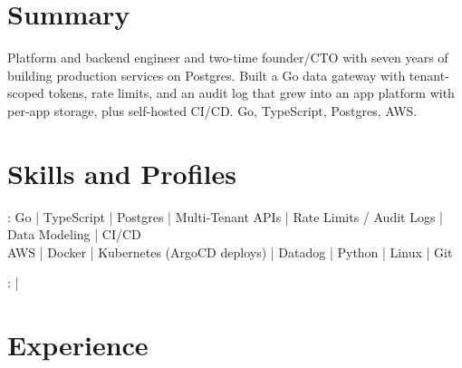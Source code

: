 \documentclass[print]{jack-resume}
\begin{document}
\pagecolor{darkmodeBackground}


\begin{minipage}[t][1cm][t]{.03\textwidth}
    \hfill
\end{minipage}

\section{Summary}
Platform and backend engineer and two-time founder/CTO with seven years of building production services on Postgres. Built a Go data gateway with tenant-scoped tokens, rate limits, and an audit log that grew into an app platform with per-app storage, plus self-hosted CI/CD. Go, TypeScript, Postgres, AWS.
\sectionsep

\section{Skills and Profiles}
:
Go \hfill | \hfill
TypeScript \hfill | \hfill
Postgres \hfill | \hfill
Multi-Tenant APIs \hfill | \hfill
Rate Limits / Audit Logs \hfill | \hfill
Data Modeling \hfill | \hfill
CI/CD \\
\hspace{1.0cm} AWS \hfill | \hfill
Docker \hfill | \hfill
Kubernetes (ArgoCD deploys) \hfill | \hfill
Datadog \hfill | \hfill
Python \hfill | \hfill
Linux \hfill | \hfill
Git \\

\raggedright{
    :
      \href{https://www.linkedin.com/in/jack-sturtevant/}{ \ExternalLink} |
     \href{https://github.com/jacksturt}{ \ExternalLink}}

\section{Experience}
\end{document}
